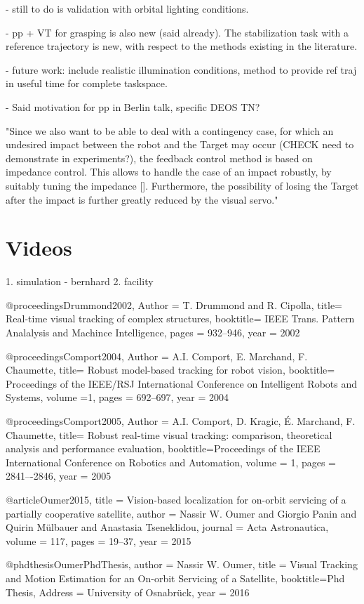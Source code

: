 - still to do is validation with orbital lighting conditions.

- pp + VT for grasping is also new (said already). The stabilization task with a reference trajectory is new, with respect to the methods existing in the literature. 

- future work: include realistic illumination conditions, method to provide ref traj in useful time for complete taskspace.

- Said motivation for pp in Berlin talk, specific DEOS TN?

"Since we also want to be able to deal with a contingency case, for which an undesired impact between the robot and the Target may occur (CHECK need to demonstrate in experiments?), the feedback control method is based on impedance control. This allows to handle the case of an impact robustly, by suitably tuning the impedance []. Furthermore, the possibility of losing the Target after the impact is further greatly reduced by the visual servo."


%
\section{Videos}
1. simulation - bernhard
2. facility

%

@proceedings{Drummond2002,
Author = {T. Drummond and R. Cipolla},
title=  {Real-time visual tracking of complex structures},
booktitle= {IEEE Trans. Pattern Analalysis and Machince Intelligence},
pages = {932--946},
year = {2002}
}

@proceedings{Comport2004,
Author ={ A.I. Comport, E. Marchand, F. Chaumette},
title=  {Robust model-based tracking for robot vision},
booktitle= {Proceedings of the IEEE/RSJ International Conference on Intelligent Robots and Systems},
volume ={1},
pages = {692--697},
year = {2004}
}


@proceedings{Comport2005,
Author = {A.I. Comport, D. Kragic, É. Marchand, F. Chaumette},
title=  {Robust real-time visual tracking: comparison, theoretical analysis and performance evaluation},
booktitle={Proceedings of the IEEE International Conference on Robotics and Automation},
volume = {1},
pages = {2841–-2846},
year = {2005}
}

@article{Oumer2015,
title = {Vision-based localization for on-orbit servicing of a partially cooperative satellite},
author = {Nassir W. Oumer and Giorgio Panin and Quirin Mülbauer and Anastasia Tseneklidou},
journal = {Acta Astronautica},
volume = {117},
pages = {19--37},
year = {2015}
}

@phdthesis{OumerPhdThesis,
author = {Nassir W. Oumer}, 
title = {Visual Tracking and Motion Estimation for an On-orbit Servicing of a Satellite},
booktitle={Phd Thesis},
Address = {University of Osnabrück},
year = {2016}
}

